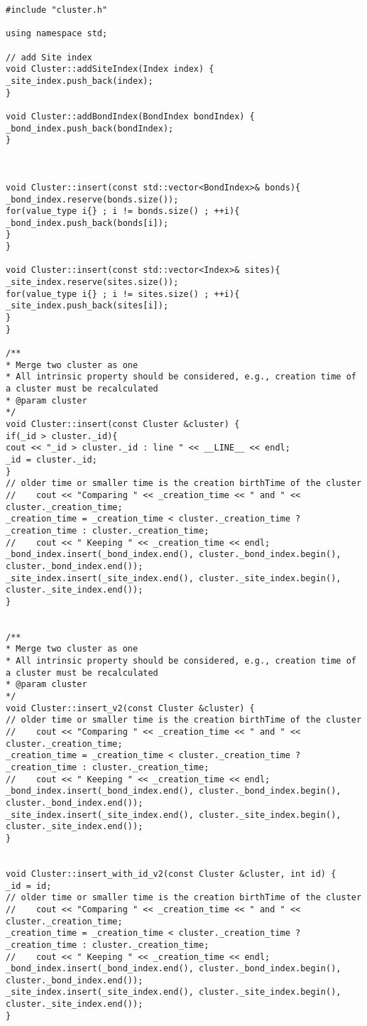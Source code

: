 \begin{lstlisting}[style=CStyle]
#include "cluster.h"

using namespace std;

// add Site index
void Cluster::addSiteIndex(Index index) {
_site_index.push_back(index);
}

void Cluster::addBondIndex(BondIndex bondIndex) {
_bond_index.push_back(bondIndex);
}



void Cluster::insert(const std::vector<BondIndex>& bonds){
_bond_index.reserve(bonds.size());
for(value_type i{} ; i != bonds.size() ; ++i){
_bond_index.push_back(bonds[i]);
}
}

void Cluster::insert(const std::vector<Index>& sites){
_site_index.reserve(sites.size());
for(value_type i{} ; i != sites.size() ; ++i){
_site_index.push_back(sites[i]);
}
}

/**
* Merge two cluster as one
* All intrinsic property should be considered, e.g., creation time of a cluster must be recalculated
* @param cluster
*/
void Cluster::insert(const Cluster &cluster) {
if(_id > cluster._id){
cout << "_id > cluster._id : line " << __LINE__ << endl;
_id = cluster._id;
}
// older time or smaller time is the creation birthTime of the cluster
//    cout << "Comparing " << _creation_time << " and " << cluster._creation_time;
_creation_time = _creation_time < cluster._creation_time ? _creation_time : cluster._creation_time;
//    cout << " Keeping " << _creation_time << endl;
_bond_index.insert(_bond_index.end(), cluster._bond_index.begin(), cluster._bond_index.end());
_site_index.insert(_site_index.end(), cluster._site_index.begin(), cluster._site_index.end());
}


/**
* Merge two cluster as one
* All intrinsic property should be considered, e.g., creation time of a cluster must be recalculated
* @param cluster
*/
void Cluster::insert_v2(const Cluster &cluster) {
// older time or smaller time is the creation birthTime of the cluster
//    cout << "Comparing " << _creation_time << " and " << cluster._creation_time;
_creation_time = _creation_time < cluster._creation_time ? _creation_time : cluster._creation_time;
//    cout << " Keeping " << _creation_time << endl;
_bond_index.insert(_bond_index.end(), cluster._bond_index.begin(), cluster._bond_index.end());
_site_index.insert(_site_index.end(), cluster._site_index.begin(), cluster._site_index.end());
}


void Cluster::insert_with_id_v2(const Cluster &cluster, int id) {
_id = id;
// older time or smaller time is the creation birthTime of the cluster
//    cout << "Comparing " << _creation_time << " and " << cluster._creation_time;
_creation_time = _creation_time < cluster._creation_time ? _creation_time : cluster._creation_time;
//    cout << " Keeping " << _creation_time << endl;
_bond_index.insert(_bond_index.end(), cluster._bond_index.begin(), cluster._bond_index.end());
_site_index.insert(_site_index.end(), cluster._site_index.begin(), cluster._site_index.end());
}



\end{lstlisting}
